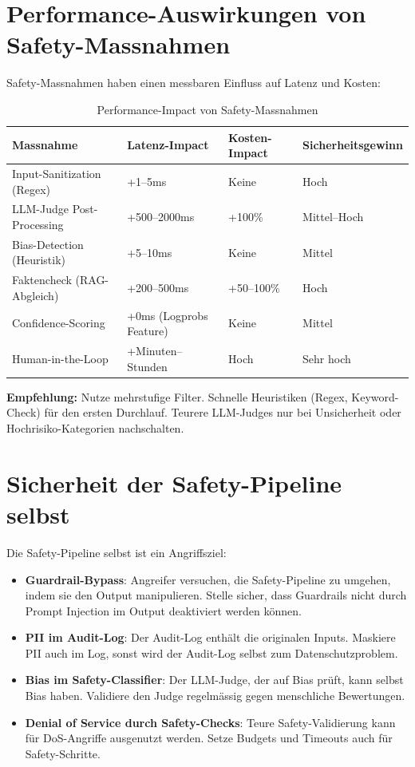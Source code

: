 \section{Performance-Auswirkungen von Safety-Massnahmen}

Safety-Massnahmen haben einen messbaren Einfluss auf Latenz und Kosten:

\begin{table}[H]
\centering
\begin{tabularx}{\linewidth}{lXXX}
\toprule
\textbf{Massnahme} & \textbf{Latenz-Impact} & \textbf{Kosten-Impact} & \textbf{Sicherheitsgewinn} \\
\midrule
Input-Sanitization (Regex) & +1--5ms & Keine & Hoch \\
LLM-Judge Post-Processing & +500--2000ms & +100\% & Mittel--Hoch \\
Bias-Detection (Heuristik) & +5--10ms & Keine & Mittel \\
Faktencheck (RAG-Abgleich) & +200--500ms & +50--100\% & Hoch \\
Confidence-Scoring & +0ms (Logprobs Feature) & Keine & Mittel \\
Human-in-the-Loop & +Minuten--Stunden & Hoch & Sehr hoch \\
\bottomrule
\end{tabularx}
\caption{Performance-Impact von Safety-Massnahmen}
\end{table}

\textbf{Empfehlung:} Nutze mehrstufige Filter. Schnelle Heuristiken (Regex, Keyword-Check) für den ersten Durchlauf. Teurere LLM-Judges nur bei Unsicherheit oder Hochrisiko-Kategorien nachschalten.

\section{Sicherheit der Safety-Pipeline selbst}

Die Safety-Pipeline selbst ist ein Angriffsziel:

\begin{itemize}[leftmargin=*]
    \item \textbf{Guardrail-Bypass}: Angreifer versuchen, die Safety-Pipeline zu umgehen, indem sie den Output manipulieren. Stelle sicher, dass Guardrails nicht durch Prompt Injection im Output deaktiviert werden können.
    \item \textbf{PII im Audit-Log}: Der Audit-Log enthält die originalen Inputs. Maskiere PII auch im Log, sonst wird der Audit-Log selbst zum Datenschutzproblem.
    \item \textbf{Bias im Safety-Classifier}: Der LLM-Judge, der auf Bias prüft, kann selbst Bias haben. Validiere den Judge regelmässig gegen menschliche Bewertungen.
    \item \textbf{Denial of Service durch Safety-Checks}: Teure Safety-Validierung kann für DoS-Angriffe ausgenutzt werden. Setze Budgets und Timeouts auch für Safety-Schritte.
\end{itemize}

